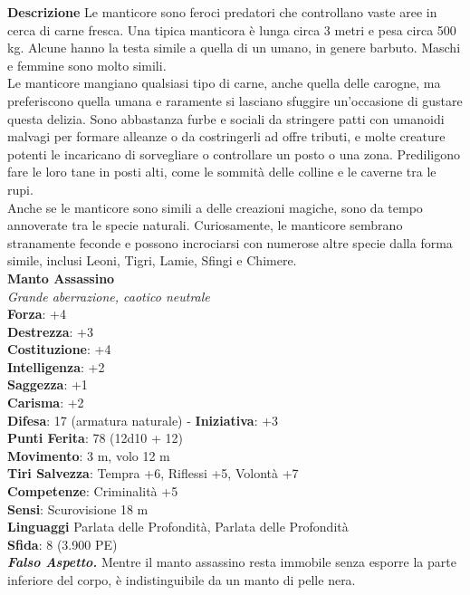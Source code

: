 \begin{multicols}{2}
\textbf{Descrizione}
Le manticore sono feroci predatori che controllano vaste aree in cerca di carne fresca. Una tipica manticora è lunga circa 3 metri e pesa circa 500 kg. Alcune hanno la testa simile a quella di un umano, in genere barbuto. Maschi e femmine sono molto simili.\\

Le manticore mangiano qualsiasi tipo di carne, anche quella delle carogne, ma preferiscono quella umana e raramente si lasciano sfuggire un'occasione di gustare questa delizia. Sono abbastanza furbe e sociali da stringere patti con umanoidi malvagi per formare alleanze o da costringerli ad offre tributi, e molte creature potenti le incaricano di sorvegliare o controllare un posto o una zona. Prediligono fare le loro tane in posti alti, come le sommità delle colline e le caverne tra le rupi.\\

Anche se le manticore sono simili a delle creazioni magiche, sono da tempo annoverate tra le specie naturali. Curiosamente, le manticore sembrano stranamente feconde e possono incrociarsi con numerose altre specie dalla forma simile, inclusi Leoni, Tigri, Lamie, Sfingi e Chimere.\\

\medskip\textbf{Manto Assassino}\\
\emph{Grande aberrazione, caotico neutrale}\\
\textbf{Forza}: +4\\
\textbf{Destrezza}: +3\\
\textbf{Costituzione}: +4\\
\textbf{Intelligenza}: +2\\
\textbf{Saggezza}: +1\\
\textbf{Carisma}: +2\\
\textbf{Difesa}: 17 (armatura naturale) - \textbf{Iniziativa}: +3\\
\textbf{Punti Ferita}: 78 (12d10 + 12)\\
\textbf{Movimento}: 3 m, volo 12 m\\
\textbf{Tiri Salvezza}: Tempra +6, Riflessi +5, Volontà +7\\
\textbf{Competenze}: Criminalità +5\\
\textbf{Sensi}: Scurovisione 18 m \\
\textbf{Linguaggi} Parlata delle Profondità, Parlata delle Profondità\\
\textbf{Sfida}: 8 (3.900 PE)\smallskip\\
\emph{\textbf{Falso Aspetto.}} Mentre il manto assassino resta immobile senza esporre la parte inferiore del corpo, è indistinguibile da un manto di pelle nera.\\


\end{multicols}
